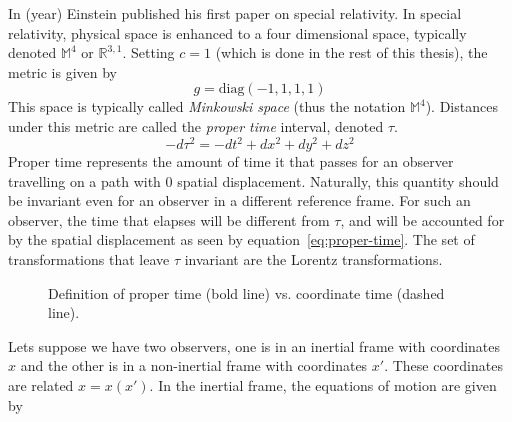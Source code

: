 In (year) Einstein published his first paper on special relativity. In special relativity, physical space is enhanced to a four dimensional space, typically denoted $\mathbb{M}^4$ or $\mathbb{R}^{3,1}$. Setting $c=1$ (which is done in the rest of this thesis), the metric is given by
\begin{equation}
    g = \text{diag}(-1,1,1,1)
\end{equation}
This space is typically called \textit{Minkowski space} (thus the notation $\mathbb{M}^4$). Distances under this metric are called the \textit{proper time} interval, denoted $\tau$.
\begin{equation}\label{eq:proper-time}
    -d\tau^2 = -dt^2 + dx^2 + dy^2 + dz^2
\end{equation}
Proper time represents the amount of time it that passes for an observer travelling on a path with 0 spatial displacement. Naturally, this quantity should be invariant even for an observer in a different reference frame. For such an observer, the time that elapses will be different from $\tau$, and will be accounted for by the spatial displacement as seen by equation~\ref{eq:proper-time}. The set of transformations that leave $\tau$ invariant are the Lorentz transformations.
\begin{figure}
    \centering
    \caption{Definition of proper time (bold line) vs. coordinate time (dashed line).}
\end{figure}
Lets suppose we have two observers, one is in an inertial frame with coordinates $x$ and the other is in a non-inertial frame with coordinates $x'$. These coordinates are related $x = x(x')$. In the inertial frame, the equations of motion are given by 
